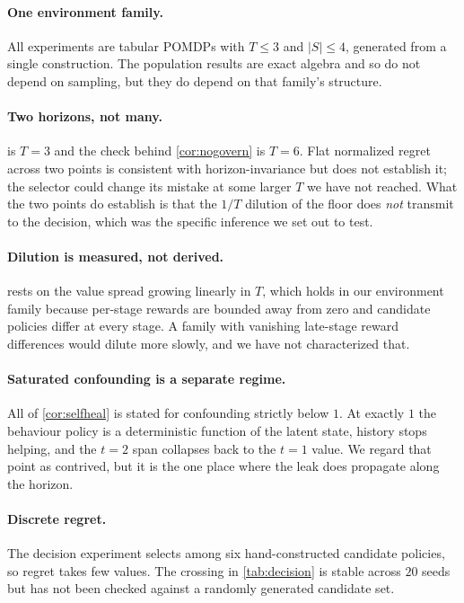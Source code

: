 \documentclass{article}
\theoremstyle{plain}
\theoremstyle{definition}
\begin{document}
\paragraph{One environment family.} All experiments are tabular POMDPs with
$T\le3$ and $|S|\le4$, generated from a single construction. The population
results are exact algebra and so do not depend on sampling, but they do depend on
that family's structure.

\paragraph{Two horizons, not many.}  is $T=3$ and the check
behind \cref{cor:nogovern} is $T=6$. Flat normalized regret across two points is
consistent with horizon-invariance but does not establish it; the selector could
change its mistake at some larger $T$ we have not reached. What the two points do
establish is that the $1/T$ dilution of the floor does \emph{not} transmit to the
decision, which was the specific inference we set out to test.

\paragraph{Dilution is measured, not derived.}  rests on the
value spread growing linearly in $T$, which holds in our environment family
because per-stage rewards are bounded away from zero and candidate policies
differ at every stage. A family with vanishing late-stage reward differences
would dilute more slowly, and we have not characterized that.

\paragraph{Saturated confounding is a separate regime.} All of
\cref{cor:selfheal} is stated for confounding strictly below $1$. At exactly $1$
the behaviour policy is a deterministic function of the latent state, history
stops helping, and the $t=2$ span collapses back to the $t=1$ value. We regard
that point as contrived, but it is the one place where the leak does propagate
along the horizon.

\paragraph{Discrete regret.} The decision experiment selects among six
hand-constructed candidate policies, so regret takes few values. The crossing in
\cref{tab:decision} is stable across $20$ seeds but has not been checked against
a randomly generated candidate set.
\end{document}
